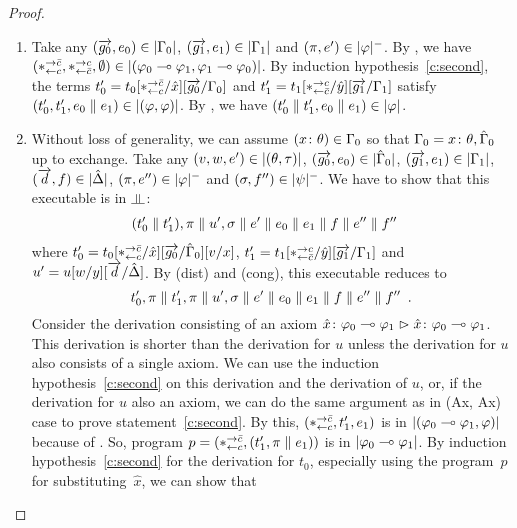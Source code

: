 \begin{proof}
\begin{description}
\begin{enumerate}[label=\textit{(\arabic{*})}]
	\item Take any $(\overrightarrow{g_0},{e_0})\in|{\Gamma_0}|$,
	      $(\overrightarrow{g_1},{e_1})\in|{\Gamma_1}|$ and
	      $(\pi,e')\in|{\varphi}|^-$.
	      By , we have
	      $(\ast^{\rightarrow {\bar{c}}}_{\leftarrow{c}},\ast^{\rightarrow {c}}_{\leftarrow{\bar{c}}},\emptyset)\in|{(\varphi_0\multimap\varphi_1,\varphi_1\multimap\varphi_0)}|$.
	      By induction hypothesis~\ref{c:second}, the terms
	      $t'_0=t_0[\ast^{\rightarrow {\bar{c}}}_{\leftarrow{c}}/\hat{x}][\overrightarrow{g_0}/\Gamma_0]$ and
	      $t'_1=t_1[\ast^{\rightarrow {c}}_{\leftarrow{\bar{c}}}/\hat{y}][\overrightarrow{g_1}/\Gamma_1]$
	      satisfy
	      $(t_0',t_1',{e_0}\parallel
	      {e_1})\in|{(\varphi,\varphi)}|$.
	      By , we have $(t'_0\parallel t'_1,
	      {e_0}\parallel {e_1})\in|{\varphi}|$.
	\item
	      Without loss of generality,
	      we can assume $({x} \colon{\theta})\in\Gamma_0$ so that
	      $\Gamma_0 ={x} \colon{\theta}, {\hat{\Gamma}_0}$ up to exchange.
	      Take any
	      $(v,w,e')\in|{(\theta,\tau)}|$,
	     $(\overrightarrow{g_0},{e_0})\in|{\hat{\Gamma}_0}|$,
	     $(\overrightarrow{g_1},{e_1})\in|{\Gamma_1}|$,
	     $(\overrightarrow d, f)\in|{\hat{\Delta}}|$,
	     $(\pi,e'')\in|{\varphi}|^-$ and
	     $(\sigma,f'')\in|{\psi}|^-$.
	     We have to show that this executable is in $\bbot$:
	     \begin{align*}
	      & (t_0'\parallel
	      t'_1),\pi\parallel
	      u',\sigma\parallel e'\parallel
	      {e_0}\parallel {e_1}\parallel  f\parallel e''\parallel f''
	     \end{align*}
	     where $t_0' = t_0[\ast^{\rightarrow {\bar{c}}}_{\leftarrow{c}}/\hat
	     x][\overrightarrow{g_0}/\hat{\Gamma}_0][v/x]$,
	     $t'_1 = t_1[\ast^{\rightarrow {c}}_{\leftarrow{\bar{c}}}/\hat y][\overrightarrow{g_1}/\Gamma_1]$ and $u' = u[w/y][\overrightarrow{d}/\hat{\Delta}]$.
	     By (dist) and (cong), this executable reduces to
	     \[
	      t'_0,\pi\parallel t'_1,\pi\parallel u',\sigma\parallel e'\parallel
	     {e_0}\parallel {e_1}\parallel{f}\parallel e''\parallel f''\enspace.
	     \]
	     Consider the derivation consisting of an axiom
	     ${{\hat x} \colon{\varphi_0\multimap\varphi_1}}\vartriangleright{ {\hat x} \colon{\varphi_0\multimap\varphi_1} }$.
	     This derivation is shorter than the derivation for $u$
	     unless the derivation for $u$ also consists of a single axiom.
	     We can use the induction hypothesis~\ref{c:second} on
	     this derivation and the derivation of $u$, or, if the
	     derivation for $u$ also an axiom, we can do the same
	     argument as in (Ax, Ax) case to prove
	     statement~\ref{c:second}.
	     By this, $(\ast^{\rightarrow {\bar{c}}}_{\leftarrow{c}}, t_1',{e_1})$ is in
	     $|{(\varphi_0\multimap\varphi_1,\varphi)}|$
	     because of .
	     So, program $p =(\ast^{\rightarrow {\bar{c}}}_{\leftarrow{c}},(t_1',\pi\parallel{e_1}))$ is in
	     $|{\varphi_0\multimap\varphi_1}|$.
	     By induction hypothesis~\ref{c:second} for the derivation
	     for $t_0$, especially using the program~$p$ for
	     substituting~$\hat x$, we can show that

\end{enumerate}
\end{description}
\end{proof}
